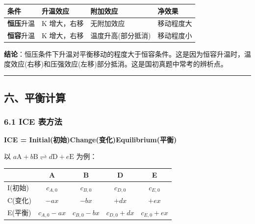{\def\LTcaptype{none} %
\begin{longtable}[]{@{}
  >{\raggedright\arraybackslash}p{}
  >{\raggedright\arraybackslash}p{}
  >{\raggedright\arraybackslash}p{}
  >{\raggedright\arraybackslash}p{}@{}}
\toprule\noalign{}
\begin{minipage}[b]{\linewidth}\raggedright
条件
\end{minipage} & \begin{minipage}[b]{\linewidth}\raggedright
升温效应
\end{minipage} & \begin{minipage}[b]{\linewidth}\raggedright
附加效应
\end{minipage} & \begin{minipage}[b]{\linewidth}\raggedright
净效果
\end{minipage} \\
\midrule\noalign{}
\endhead
\bottomrule\noalign{}
\endlastfoot
\textbf{恒压}升温 & K 增大，右移 & 无附加效应 & 移动程度大 \\
\textbf{恒容}升温 & K 增大，右移 & 温度升高(部分抵消) & 移动程度小 \\
\end{longtable}
}

\textbf{结论}：恒压条件下升温对平衡移动的程度大于恒容条件。这是因为恒容升温时，温度效应(右移)和压强效应(左移)部分抵消。这是国初真题中常考的辨析点。

\begin{center}\rule{0.5\linewidth}{0.5pt}\end{center}

\subsection{六、平衡计算}\label{ux516dux5e73ux8861ux8ba1ux7b97}

\subsubsection{6.1 ICE 表方法}\label{ice-ux8868ux65b9ux6cd5}

\textbf{ICE = Initial(初始)\箭 Change(变化)\箭 Equilibrium(平衡)}

以 \(a\mathrm{A} + b\mathrm{B} \rightleftharpoons d\mathrm{D} + e\mathrm{E}\) 为例：

{\def\LTcaptype{none} %
\begin{longtable}[]{@{}lcccc@{}}
\toprule\noalign{}
& A & B & D & E \\
\midrule\noalign{}
\endhead
\bottomrule\noalign{}
\endlastfoot
I(初始) & \(c_{A,0}\) & \(c_{B,0}\) & \(c_{D,0}\) & \(c_{E,0}\) \\
C(变化) & \(-ax\) & \(-bx\) & \(+dx\) & \(+ex\) \\
E(平衡) & \(c_{A,0}-ax\) & \(c_{B,0}-bx\) & \(c_{D,0}+dx\) & \(c_{E,0}+ex\) \\
\end{longtable}
}

